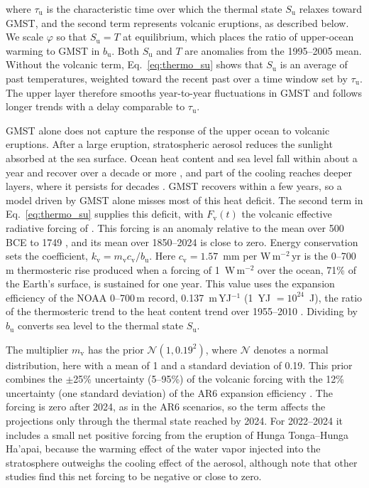 \documentclass[draft,linenumbers]{agujournal2025}
\begin{document}
where $\tau_{\mathrm{u}}$ is the characteristic time over which the thermal state $S_{\mathrm{u}}$ relaxes toward GMST, and the second term represents volcanic eruptions, as described below. We scale $\varphi$ so that $S_{\mathrm{u}} = T$ at equilibrium, which places the ratio of upper-ocean warming to GMST in $b_{\mathrm{u}}$. Both $S_{\mathrm{u}}$ and $T$ are anomalies from the 1995--2005 mean. Without the volcanic term, Eq.~\ref{eq:thermo_su} shows that $S_{\mathrm{u}}$ is an average of past temperatures, weighted toward the recent past over a time window set by $\tau_{\mathrm{u}}$. The upper layer therefore smooths year-to-year fluctuations in GMST and follows longer trends with a delay comparable to $\tau_{\mathrm{u}}$.

GMST alone does not capture the response of the upper ocean to volcanic eruptions. After a large eruption, stratospheric aerosol reduces the sunlight absorbed at the sea surface. Ocean heat content and sea level fall within about a year and recover over a decade or more \citep{Church2005}, and part of the cooling reaches deeper layers, where it persists for decades \citep{Gleckler2006}. GMST recovers within a few years, so a model driven by GMST alone misses most of this heat deficit. The second term in Eq.~\ref{eq:thermo_su} supplies this deficit, with $F_{\mathrm{v}}(t)$ the volcanic effective radiative forcing of \citet{Forster2025}. This forcing is an anomaly relative to the mean over 500 BCE to 1749 \citep{Forster2021}, and its mean over 1850--2024 is close to zero. Energy conservation sets the coefficient, $k_{\mathrm{v}} = m_{\mathrm{v}}c_{\mathrm{v}}/b_{\mathrm{u}}$. Here $c_{\mathrm{v}} = 1.57$~mm per W\,m$^{-2}$\,yr is the 0--700\,m thermosteric rise produced when a forcing of 1~W\,m$^{-2}$ over the ocean, 71\% of the Earth's surface, is sustained for one year. This value uses the expansion efficiency of the NOAA 0--700\,m record, 0.137~m\,YJ$^{-1}$ (1~YJ $= 10^{24}$~J), the ratio of the thermosteric trend to the heat content trend over 1955--2010 \citep{Levitus2012}. Dividing by $b_{\mathrm{u}}$ converts sea level to the thermal state $S_{\mathrm{u}}$.

The multiplier $m_{\mathrm{v}}$ has the prior $\mathcal{N}(1, 0.19^2)$, where $\mathcal{N}$ denotes a normal distribution, here with a mean of 1 and a standard deviation of 0.19. This prior combines the $\pm$25\% uncertainty (5--95\%) of the volcanic forcing \citep{Forster2021} with the 12\% uncertainty (one standard deviation) of the AR6 expansion efficiency \citep{Fox-Kemper2021}. The forcing is zero after 2024, as in the AR6 scenarios, so the term affects the projections only through the thermal state reached by 2024. For 2022--2024 it includes a small net positive forcing from the eruption of Hunga Tonga--Hunga Ha'apai, because the warming effect of the water vapor injected into the stratosphere outweighs the cooling effect of the aerosol, although \citet{Forster2025} note that other studies find this net forcing to be negative or close to zero.
\end{document}
